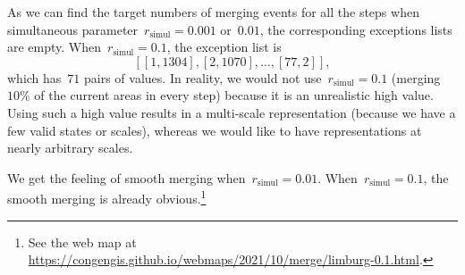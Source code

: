 \documentclass[twocolumn]{svjour3}          %
\begin{document}
As we can find the target numbers of merging events for all the steps
when simultaneous parameter~$r_\mathrm{simul}= 0.001$ or~$0.01$, 
the corresponding exceptions lists are empty.
When~$r_\mathrm{simul}= 0.1$,
the exception list is
$$[[1, 1304], [2, 1070], \dots, [77, 2]],$$
which has~$71$ pairs of values.
In reality, we would not use~$r_\mathrm{simul}= 0.1$
(merging~$10\%$ of the current areas in every step)
because it is an unrealistic high value.
Using such a high value results in a multi-scale representation
(because we have a few valid states or scales),
whereas we would like to have representations at nearly
arbitrary scales.



We get the feeling of smooth merging when~$r_\mathrm{simul}= 0.01$.
When~$r_\mathrm{simul}= 0.1$, 
the smooth merging is already obvious.\footnote{%
See the web map at
\url{https://congengis.github.io/webmaps/2021/10/merge/limburg-0.1.html}.}
 





\end{document}
